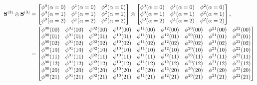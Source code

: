 \begin{align}
    \mathbf{S}^{(3)} \otimes \mathbf{S}^{(3)} &= \begin{bmatrix}
        \phi^0(\alpha=0) & \phi^1(\alpha=0) & \phi^2(\alpha=0)\\
        \phi^0(\alpha=1) & \phi^1(\alpha=1) & \phi^2(\alpha=1)\\
        \phi^0(\alpha=2) & \phi^1(\alpha=2) & \phi^2(\alpha=2)\\
    \end{bmatrix} \otimes \begin{bmatrix}
        \phi^0(\alpha=0) & \phi^1(\alpha=0) & \phi^2(\alpha=0)\\
        \phi^0(\alpha=1) & \phi^1(\alpha=1) & \phi^2(\alpha=1)\\
        \phi^0(\alpha=2) & \phi^1(\alpha=2) & \phi^2(\alpha=2)\\
    \end{bmatrix}, \notag\\
    &=  \begin{bmatrix}
        \phi^{00}(00) & \phi^{01}(00) & \phi^{02}(00) & \phi^{10}(00) & \phi^{11}(00) & \phi^{12}(00) & \phi^{20}(00) & \phi^{21}(00) & \phi^{22}(00) \\
        \phi^{00}(01) & \phi^{01}(01) & \phi^{02}(01) & \phi^{10}(01) & \phi^{11}(01) & \phi^{12}(01) & \phi^{20}(01) & \phi^{21}(01) & \phi^{22}(01) \\
        \phi^{00}(02) & \phi^{01}(02) & \phi^{02}(02) & \phi^{10}(02) & \phi^{11}(02) & \phi^{12}(02) & \phi^{20}(02) & \phi^{21}(02) & \phi^{22}(02) \\
        \phi^{00}(10) & \phi^{01}(10) & \phi^{02}(10) & \phi^{10}(10) & \phi^{11}(10) & \phi^{12}(10) & \phi^{20}(10) & \phi^{21}(10) & \phi^{22}(10) \\
        \phi^{00}(11) & \phi^{01}(11) & \phi^{02}(11) & \phi^{10}(11) & \phi^{11}(11) & \phi^{12}(11) & \phi^{20}(11) & \phi^{21}(11) & \phi^{22}(11) \\
        \phi^{00}(12) & \phi^{01}(12) & \phi^{02}(12) & \phi^{10}(12) & \phi^{11}(12) & \phi^{12}(12) & \phi^{20}(12) & \phi^{21}(12) & \phi^{22}(12) \\
        \phi^{00}(20) & \phi^{01}(20) & \phi^{02}(20) & \phi^{10}(20) & \phi^{11}(20) & \phi^{12}(20) & \phi^{20}(20) & \phi^{21}(20) & \phi^{22}(20) \\
        \phi^{00}(21) & \phi^{01}(21) & \phi^{02}(21) & \phi^{10}(21) & \phi^{11}(21) & \phi^{12}(21) & \phi^{20}(21) & \phi^{21}(21) & \phi^{22}(21) \\

\end{bmatrix}
\end{align}
